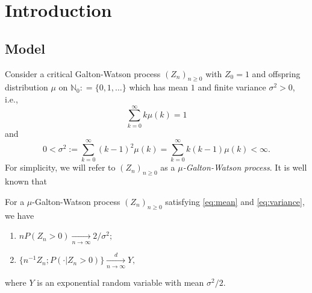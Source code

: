 \documentclass[ECP]{ejpecp} %
\begin{document}



\section{Introduction}
\subsection{Model}
\label{sec:model}
Consider a critical Galton-Watson process
$(Z_n)_{n\ge 0}$ 	with $Z_0 = 1$
and offspring distribution $\mu$ on $\mathbb N_0 : = \{0,1,\dots\}$ which has mean $1$ and finite variance $\sigma^2>0$, i.e.,
\begin{equation}\label{eq:mean}
\sum_{k=0}^\infty k \mu(k)	=1
\end{equation}
and
\begin{equation}\label{eq:variance}
0	
<	\sigma^2
:=	\sum_{k=0}^\infty  (k-1)^2 \mu(k)
=	\sum_{k=0}^\infty k(k-1) \mu(k)
<	\infty.
\end{equation}
For simplicity,
we will refer to $(Z_n)_{n\geq 0}$ as a  \emph{$\mu$-Galton-Watson process}.
It is well known that
\begin{theorem} \label{thm: Kolmogrov and Yaglom theorem}
	For a $\mu$-Galton-Watson process $(Z_n)_{n\geq 0}$
	satisfying \eqref{eq:mean} and \eqref{eq:variance}, we have
	\begin{enumerate}
		\item \label{thm:kolmogorov}
		$n P (Z_n>0) \xrightarrow[n \to \infty]{} 2/\sigma^2;$
		\item \label{thm:yaglom}
		$\{n^{-1}Z_n; P(\cdot | Z_n>0)\}\xrightarrow[n \to \infty]{d} Y,$
	\end{enumerate}
	where $Y$ is an exponential random variable with mean $\sigma^2/2$.
\end{theorem}
\end{document}
